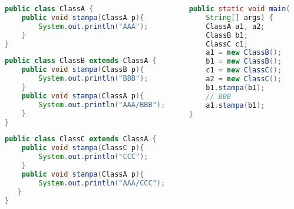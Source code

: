 \documentclass{beamer}
\begin{document}
\begin{frame}[fragile]
\begin{columns}
\begin{column}{0.6\textwidth}
\begin{lstlisting}[language=Java,escapechar=|]
public class ClassA {
    public void stampa(ClassA p){
        System.out.println("AAA");
    }
}
\end{lstlisting}
\begin{lstlisting}[language=Java,escapechar=|]
public class ClassB extends ClassA {
    public void stampa(ClassB p){
        System.out.println("BBB");
    }
    public void stampa(ClassA p){
        System.out.println("AAA/BBB");
    }
}
\end{lstlisting}
\begin{lstlisting}[language=Java,escapechar=|]
public class ClassC extends ClassA {
    public void stampa(ClassC p){
        System.out.println("CCC");
    }
    public void stampa(ClassA p){
        System.out.println("AAA/CCC");
   }
}
\end{lstlisting}
\end{column}
\begin{column}{0.4\textwidth}
\begin{lstlisting}[language=Java,escapechar=|]
public static void main(
    String[] args) {
    ClassA a1, a2;
    ClassB b1;
    ClassC c1;
    a1 = new ClassB();
    b1 = new ClassB();
    c1 = new ClassC();
    a2 = new ClassC();
    b1.stampa(b1); 
    // BBB
    a1.stampa(b1); 
}
\end{lstlisting}
\end{column}
\end{columns}
\end{frame}
\end{document}
